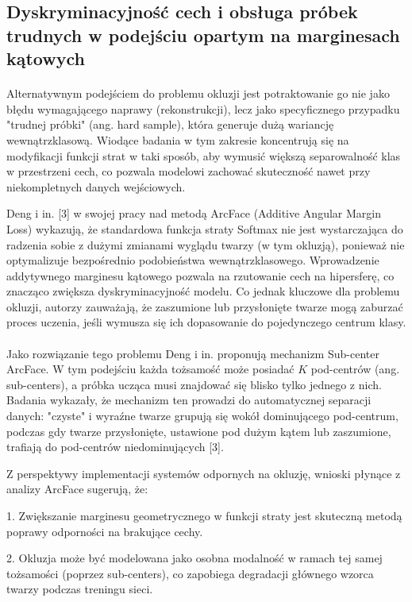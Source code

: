 \subsection{Dyskryminacyjność cech i obsługa próbek trudnych w podejściu opartym na marginesach kątowych}

\paragraph{}Alternatywnym podejściem do problemu okluzji jest potraktowanie go nie jako błędu wymagającego naprawy (rekonstrukcji), lecz jako specyficznego przypadku "trudnej próbki" (ang. hard sample), która generuje dużą wariancję wewnątrzklasową. Wiodące badania w tym zakresie koncentrują się na modyfikacji funkcji strat w taki sposób, aby wymusić większą separowalność klas w przestrzeni cech, co pozwala modelowi zachować skuteczność nawet przy niekompletnych danych wejściowych.

Deng i in. [3] w swojej pracy nad metodą ArcFace (Additive Angular Margin Loss) wykazują, że standardowa funkcja straty Softmax nie jest wystarczająca do radzenia sobie z dużymi zmianami wyglądu twarzy (w tym okluzją), ponieważ nie optymalizuje bezpośrednio podobieństwa wewnątrzklasowego. Wprowadzenie addytywnego marginesu kątowego pozwala na rzutowanie cech na hipersferę, co znacząco zwiększa dyskryminacyjność modelu. Co jednak kluczowe dla problemu okluzji, autorzy zauważają, że zaszumione lub przysłonięte twarze mogą zaburzać proces uczenia, jeśli wymusza się ich dopasowanie do pojedynczego centrum klasy.

\paragraph{}Jako rozwiązanie tego problemu Deng i in. proponują mechanizm Sub-center ArcFace. W tym podejściu każda tożsamość może posiadać $K$ pod-centrów (ang. sub-centers), a próbka ucząca musi znajdować się blisko tylko jednego z nich. Badania wykazały, że mechanizm ten prowadzi do automatycznej separacji danych: "czyste" i wyraźne twarze grupują się wokół dominującego pod-centrum, podczas gdy twarze przysłonięte, ustawione pod dużym kątem lub zaszumione, trafiają do pod-centrów niedominujących [3].

Z perspektywy implementacji systemów odpornych na okluzję, wnioski płynące z analizy ArcFace sugerują, że:

1. Zwiększanie marginesu geometrycznego w funkcji straty jest skuteczną metodą poprawy odporności na brakujące cechy.

2. Okluzja może być modelowana jako osobna modalność w ramach tej samej tożsamości (poprzez sub-centers), co zapobiega degradacji głównego wzorca twarzy podczas treningu sieci.